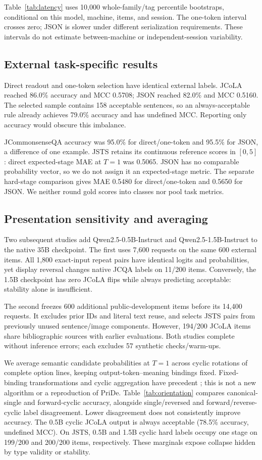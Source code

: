 \documentclass[11pt]{article}
\begin{document}
Table~\ref{tab:latency} uses 10,000 whole-family/tag percentile bootstraps, conditional on this model, machine, items, and session. The one-token interval crosses zero; JSON is slower under different serialization requirements. These intervals do not estimate between-machine or independent-session variability.

\subsection{External task-specific results}
Direct readout and one-token selection have identical external labels. JCoLA reached 86.0\% accuracy and MCC 0.5708; JSON reached 82.0\% and MCC 0.5160. The selected sample contains 158 acceptable sentences, so an always-acceptable rule already achieves 79.0\% accuracy and has undefined MCC. Reporting only accuracy would obscure this imbalance.

JCommonsenseQA accuracy was 95.0\% for direct/one-token and 95.5\% for JSON, a difference of one example. JSTS retains its continuous reference scores in $[0,5]$: direct expected-stage MAE at $T=1$ was 0.5065. JSON has no comparable probability vector, so we do not assign it an expected-stage metric. The separate hard-stage comparison gives MAE 0.5480 for direct/one-token and 0.5650 for JSON. We neither round gold scores into classes nor pool task metrics.

\subsection{Presentation sensitivity and averaging}
Two subsequent studies add Qwen2.5-0.5B-Instruct and Qwen2.5-1.5B-Instruct to the native 35B checkpoint. The first uses 7,600 requests on the same 600 external items. All 1,800 exact-input repeat pairs have identical logits and probabilities, yet display reversal changes native JCQA labels on 11/200 items. Conversely, the 1.5B checkpoint has zero JCoLA flips while always predicting acceptable: stability alone is insufficient.

The second freezes 600 additional public-development items before its 14,400 requests. It excludes prior IDs and literal text reuse, and selects JSTS pairs from previously unused sentence/image components. However, 194/200 JCoLA items share bibliographic sources with earlier evaluations. Both studies complete without inference errors; each excludes 57 synthetic checks/warm-ups.

We average semantic candidate probabilities at $T=1$ across cyclic rotations of complete option lines, keeping output-token--meaning bindings fixed. Fixed-binding transformations and cyclic aggregation have precedent \citep{wei2024unveiling,zheng2024selectors}; this is not a new algorithm or a reproduction of PriDe. Table~\ref{tab:orientation} compares canonical-single and forward-cyclic accuracy, alongside single/reversed and forward/reverse-cyclic label disagreement. Lower disagreement does not consistently improve accuracy. The 0.5B cyclic JCoLA output is always acceptable (78.5\% accuracy, undefined MCC). On JSTS, 0.5B and 1.5B cyclic hard labels occupy one stage on 199/200 and 200/200 items, respectively. These marginals expose collapse hidden by type validity or stability.
\end{document}
